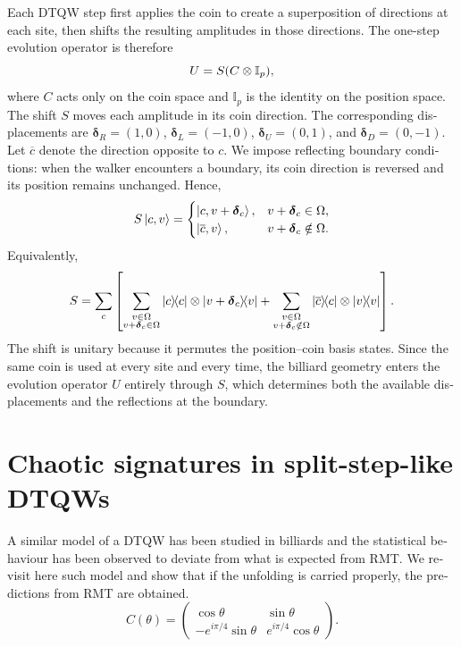 \begin{otherlanguage}{english}
Each DTQW step first applies the coin to create a superposition of
directions at each site, then shifts the resulting amplitudes in those
directions. The one-step evolution operator is therefore
\begin{equation}
    U=S\qty(C\otimes\mathbb{I}_p),
\end{equation}
where $C$  acts only on the coin space and $\mathbb{I}_p$ is the identity
on the position space. The shift $S$ moves each amplitude in its coin
direction. The corresponding displacements are
$\boldsymbol\delta_R=(1,0)$, $\boldsymbol\delta_L=(-1,0)$,
$\boldsymbol\delta_U=(0,1)$, and $\boldsymbol\delta_D=(0,-1)$.
Let $\overline c$ denote the direction opposite to $c$.
We impose reflecting boundary conditions: when the walker encounters
a boundary, its coin direction is reversed and its position remains
unchanged. Hence,
\begin{equation}
    S\ket{c,v}=
    \begin{cases}
        \ket{c,v+\boldsymbol\delta_c},
            &v+\boldsymbol\delta_c\in\Omega,\\
        \ket{\overline c,v},
            &v+\boldsymbol\delta_c\notin\Omega.
    \end{cases}
    \label{eq:walk-shift-action}
\end{equation}
Equivalently,
\begin{equation}
    S=\sum_c\left[
        \sum_{\substack{v\in\Omega\\v+\boldsymbol\delta_c\in\Omega}}
        \ketbra{c}{c}\otimes\ketbra{v+\boldsymbol\delta_c}{v}
        +\sum_{\substack{v\in\Omega\\v+\boldsymbol\delta_c\notin\Omega}}
        \ketbra{\overline c}{c}\otimes\ketbra{v}{v}
    \right].
    \label{eq:walk-shift-operator}
\end{equation}
The shift is unitary because it permutes the position--coin basis states.
Since the same coin is used at every site and every time, the billiard geometry enters
the evolution operator $U$ entirely through $S$, which determines both
the available displacements and the reflections at the boundary.

\section{Chaotic signatures in split-step-like DTQWs} %
A similar model of a DTQW has been studied in billiards and the statistical behaviour has been observed to deviate 
from what is expected from RMT. We revisit here such model and show that if the unfolding is carried properly, the 
predictions from RMT are obtained.  
\begin{equation}\label{eq:coin_AL}
C(\theta) =
\begin{pmatrix}
\cos\theta & \sin\theta \\
-e^{i\pi/4}\sin\theta & e^{i\pi/4}\cos\theta
\end{pmatrix}.
\end{equation}


\end{otherlanguage}
